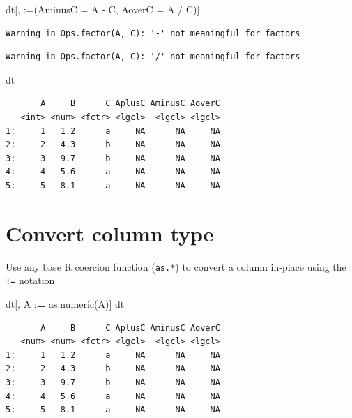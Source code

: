 \documentclass[
]{book}
\newenvironment{Shaded}{\begin{snugshade}}{\end{snugshade}}
\newcommand{\AttributeTok}[1]{\textcolor[rgb]{0.77,0.63,0.00}{#1}}
\newcommand{\ErrorTok}[1]{\textcolor[rgb]{0.64,0.00,0.00}{\textbf{#1}}}
\newcommand{\FunctionTok}[1]{\textcolor[rgb]{0.00,0.00,0.00}{#1}}
\newcommand{\NormalTok}[1]{#1}
\newcommand{\SpecialCharTok}[1]{\textcolor[rgb]{0.00,0.00,0.00}{#1}}
\newcommand{\StringTok}[1]{\textcolor[rgb]{0.31,0.60,0.02}{#1}}
\begin{document}
\begin{Shaded}
\begin{Highlighting}[]
\NormalTok{dt[, }\StringTok{\textasciigrave{}}\AttributeTok{:=}\StringTok{\textasciigrave{}}\NormalTok{(}\AttributeTok{AminusC =}\NormalTok{ A }\SpecialCharTok{{-}}\NormalTok{ C, }\AttributeTok{AoverC =}\NormalTok{ A }\SpecialCharTok{/}\NormalTok{ C)]}
\end{Highlighting}
\end{Shaded}

\begin{verbatim}
Warning in Ops.factor(A, C): '-' not meaningful for factors
\end{verbatim}

\begin{verbatim}
Warning in Ops.factor(A, C): '/' not meaningful for factors
\end{verbatim}

\begin{Shaded}
\begin{Highlighting}[]
\NormalTok{dt}
\end{Highlighting}
\end{Shaded}

\begin{verbatim}
       A     B      C AplusC AminusC AoverC
   <int> <num> <fctr> <lgcl>  <lgcl> <lgcl>
1:     1   1.2      a     NA      NA     NA
2:     2   4.3      b     NA      NA     NA
3:     3   9.7      b     NA      NA     NA
4:     4   5.6      a     NA      NA     NA
5:     5   8.1      a     NA      NA     NA
\end{verbatim}

\hypertarget{convert-column-type}{%
\section{Convert column type}\label{convert-column-type}}

Use any base R coercion function (\texttt{as.*}) to convert a column in-place using the \texttt{:=} notation

\begin{Shaded}
\begin{Highlighting}[]
\NormalTok{dt[, A }\SpecialCharTok{:}\ErrorTok{=} \FunctionTok{as.numeric}\NormalTok{(A)]}
\NormalTok{dt}
\end{Highlighting}
\end{Shaded}

\begin{verbatim}
       A     B      C AplusC AminusC AoverC
   <num> <num> <fctr> <lgcl>  <lgcl> <lgcl>
1:     1   1.2      a     NA      NA     NA
2:     2   4.3      b     NA      NA     NA
3:     3   9.7      b     NA      NA     NA
4:     4   5.6      a     NA      NA     NA
5:     5   8.1      a     NA      NA     NA
\end{verbatim}
\end{document}

